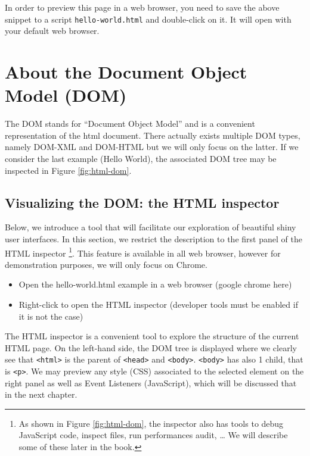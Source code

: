 \documentclass[]{book}
\providecommand{\tightlist}{%
  \setlength{\itemsep}{0pt}\setlength{\parskip}{0pt}}
\begin{document}
In order to preview this page in a web browser, you need to save the above snippet to a script \texttt{hello-world.html} and double-click on it. It will open with your default web browser.

\hypertarget{about-the-document-object-model-dom}{%
\section{About the Document Object Model (DOM)}\label{about-the-document-object-model-dom}}

The DOM stands for ``Document Object Model'' and is a convenient representation of the html document. There actually exists multiple DOM types, namely DOM-XML and DOM-HTML but we will only focus on the latter. If we consider the last example (Hello World), the associated DOM tree may be inspected in Figure \ref{fig:html-dom}.

\hypertarget{visualizing-the-dom-the-html-inspector}{%
\subsection{Visualizing the DOM: the HTML inspector}\label{visualizing-the-dom-the-html-inspector}}

Below, we introduce a tool that will facilitate our exploration of beautiful shiny user interfaces. In this section, we restrict the description to the first panel of the HTML inspector \footnote{As shown in Figure \ref{fig:html-dom}, the inspector also has tools to debug JavaScript code, inspect files, run performances audit, \ldots{} We will describe some of these later in the book.}. This feature is available in all web browser, however for demonstration purposes, we will only focus on Chrome.

\begin{itemize}
\tightlist
\item
  Open the hello-world.html example in a web browser (google chrome here)
\item
  Right-click to open the HTML inspector (developer tools must be enabled if it is not the case)
\end{itemize}

The HTML inspector is a convenient tool to explore the structure of the current HTML page. On the left-hand side, the DOM tree is displayed where we clearly see that \texttt{\textless{}html\textgreater{}} is the parent of \texttt{\textless{}head\textgreater{}} and \texttt{\textless{}body\textgreater{}}. \texttt{\textless{}body\textgreater{}} has also 1 child, that is \texttt{\textless{}p\textgreater{}}. We may preview any style (CSS) associated to the selected element on the right panel as well as Event Listeners (JavaScript), which will be discussed that in the next chapter.
\end{document}
